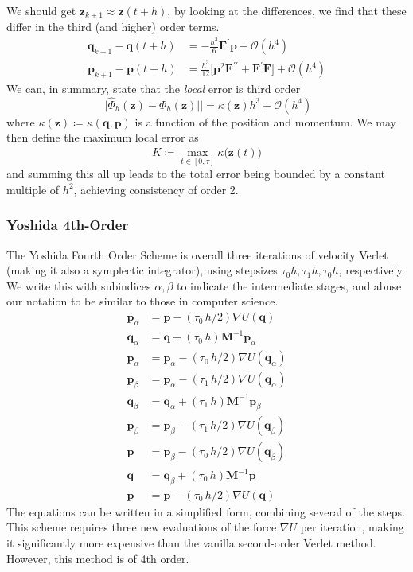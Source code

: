 \documentclass{article}
\begin{document}
      We should get $\mathbf{z}_{k+1} \approx \mathbf{z}(t + h)$, by looking at the differences, we find that these differ in the third (and higher) order terms. 
      \begin{align*}
          \mathbf{q}_{k+1} - \mathbf{q}(t + h) & = - \frac{h^3}{6} \mathbf{F}^\prime \mathbf{p} + \mathcal{O}(h^4) \\
          \mathbf{p}_{k+1} - \mathbf{p}(t + h) & = \frac{h^3}{12} \big[ \mathbf{p}^2 \mathbf{F}^{\prime\prime} + \mathbf{F}^\prime \mathbf{F} \big] + \mathcal{O}(h^4)
      \end{align*}
      We can, in summary, state that the \textit{local} error is third order
      \[||\hat{\Phi}_h (\mathbf{z}) - \Phi_h (\mathbf{z})|| = \kappa(\mathbf{z}) h^3 + \mathcal{O}(h^4)\]
      where $\kappa(\mathbf{z}) \coloneqq \kappa(\mathbf{q}, \mathbf{p})$ is a function of the position and momentum. We may then define the maximum local error as 
      \[\bar{K} \coloneqq \max_{t \in [0, \tau]} \kappa \big(\mathbf{z}(t)\big)\]
      and summing this all up leads to the total error being bounded by a constant multiple of $h^2$, achieving consistency of order 2. 

    \subsubsection{Yoshida 4th-Order}

      The Yoshida Fourth Order Scheme is overall three iterations of velocity Verlet (making it also a symplectic integrator), using stepsizes $\tau_0 h, \tau_1 h, \tau_0 h$, respectively. We write this with subindices $\alpha, \beta$ to indicate the intermediate stages, and abuse our notation to be similar to those in computer science. 
      \begin{align*}
          \mathbf{p}_\alpha & = \mathbf{p} - (\tau_0\, h/2) \nabla U(\mathbf{q}) \\
          \mathbf{q}_\alpha & = \mathbf{q} + (\tau_0 \, h) \mathbf{M}^{-1} \mathbf{p}_\alpha \\
          \mathbf{p}_\alpha & = \mathbf{p}_\alpha - (\tau_0 \, h / 2) \nabla U(\mathbf{q}_\alpha) \\
          \mathbf{p}_\beta & = \mathbf{p}_\alpha - (\tau_1 \, h/2) \nabla U(\mathbf{q}_\alpha) \\
          \mathbf{q}_\beta & = \mathbf{q}_\alpha + (\tau_1 \, h) \mathbf{M}^{-1} \mathbf{p}_\beta \\
          \mathbf{p}_\beta & = \mathbf{p}_\beta - (\tau_1 \, h/2) \nabla U(\mathbf{q}_\beta) \\
          \mathbf{p} & = \mathbf{p}_\beta - (\tau_0 \, h/2) \nabla U(\mathbf{q}_\beta) \\
          \mathbf{q} & = \mathbf{q}_\beta + (\tau_0 \, h) \mathbf{M}^{-1} \mathbf{p} \\
          \mathbf{p} & = \mathbf{p} - (\tau_0 \, h/2) \nabla U(\mathbf{q}) 
      \end{align*}
      The equations can be written in a simplified form, combining several of the steps. This scheme requires three new evaluations of the force $\nabla U$ per iteration, making it significantly more expensive than the vanilla second-order Verlet method. However, this method is of 4th order. 
\end{document}
